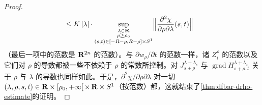 \begin{proof}
\[\begin{aligned}
&\le K\,|\lambda|\cdot\sup_{\substack{\lambda\in\mathbf{R}\\ \rho\ge\rho_{0}\\ (s,t)\in[-R-\rho,R-\rho]\times S^{1}}}\Bigl\|\frac{\partial^{2}\chi}{\partial\rho\partial\lambda}(s,t)\Bigr\|
\end{aligned}
\]
（最后一项中的范数是 $\mathbf{R}^{2n}$ 的\trEuclidean{}范数）。与 $\partial w_{\rho}/\partial t$ 的范数一样，诸 $Z_{i}^{\rho}$ 的范数以及它们对 $\rho$ 的导数都被一些不依赖于 $\rho$ 的常数所控制。对 $J_{s+\rho}^{\lambda+\lambda_{\star}}$ 与 $\operatorname{grad}H_{s+\rho,t}^{\lambda+\lambda_{\star}}$ 关于 $\rho$ 与 $\lambda$ 的导数也同样如此。于是，$\partial^{2}\chi/\partial\rho\partial\lambda$ 对一切 $(\lambda,\rho,s,t)\in\mathbf{R}\times[\rho_{0},+\infty[\,\times\,\mathbf{R}\times S^{1}$（按\trEuclidean{}范数）都\trBounded，这就结束了\cref{thm:dfbar-drho-estimate}的证明。
\end{proof}
